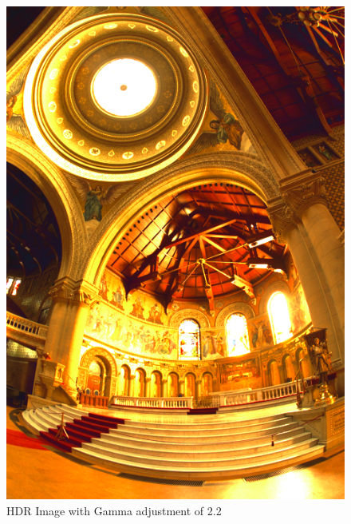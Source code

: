 \documentclass[a4paper,12pt,oneside,final]{report}
\newenvironment{changemargin}[2]{\begin{list}{}{%
\setlength{\topsep}{0pt}%
\setlength{\leftmargin}{0pt}%
\setlength{\rightmargin}{0pt}%
\setlength{\listparindent}{\parindent}%
\setlength{\itemindent}{\parindent}%
\setlength{\parsep}{0pt plus 1pt}%
\addtolength{\leftmargin}{#1}%
\addtolength{\rightmargin}{#2}%
}\item }{\end{list}}
\begin{document}
\begin{figure}[!h]
\begin{changemargin}{-50mm}{-50mm}
\center
\includegraphics[scale=0.35]{memorial_gamma_22.png}
\caption{HDR Image with Gamma adjustment of 2.2}
\end{changemargin}
\end{figure}
\end{document}
